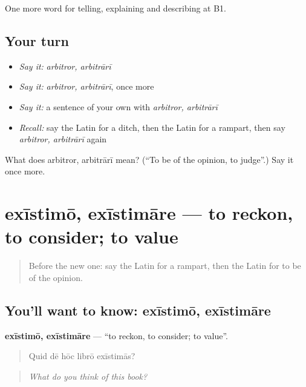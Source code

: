\begin{grammarlens}[title={What you've built}]
One more word for telling, explaining and describing at B1.
\end{grammarlens}

\subsection*{Your turn}
\begin{itemize}
\raggedright
  \item \emph{Say it:} \emph{arbitror, arbitrārī}
  \item \emph{Say it:} \emph{arbitror, arbitrārī}, once more
  \item \emph{Say it:} a sentence of your own with \emph{arbitror, arbitrārī}
  \item \emph{Recall:} say the Latin for a ditch, then the Latin for a rampart, then say \emph{arbitror, arbitrārī} again
\end{itemize}

\begin{tcolorbox}[breakable,colback=teal!4,colframe=teal!35!black,title={Before you move on}]
What does arbitror, arbitrārī mean? (\textquotedblleft{}To be of the opinion, to judge\textquotedblright{}.) Say it once more.
\end{tcolorbox}
\section[exīstimō, exīstimāre]{exīstimō, exīstimāre — to reckon, to consider; to value}

\label{lesson:LA-C357-existimo}



\begin{quote}
Before the new one: say the Latin for a rampart, then the Latin for to be of the opinion.
\end{quote}

\subsection*{You'll want to know: exīstimō, exīstimāre}
\textbf{exīstimō, exīstimāre} — \textquotedblleft{}to reckon, to consider; to value\textquotedblright{}.

\begin{quote}
Quid dē hōc librō exīstimās?
\end{quote}

\begin{quote}
\emph{What do you think of this book?}
\end{quote}

